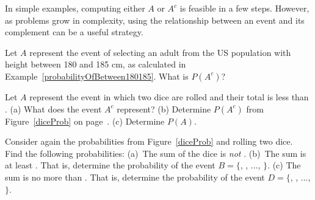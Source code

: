 In simple examples, computing either $A$ or $A^c$ is feasible in a few steps. However, as problems grow in complexity, using the relationship between an event and its complement can be a useful strategy.

\begin{exercisewrap}
\begin{nexercise}
Let $A$ represent the event of selecting an adult from the US population with height between 180 and 185 cm, as calculated in Example~\ref{probabilityOfBetween180185}. What is $P(A^c)$?\footnotemark{}
\end{nexercise}
\end{exercisewrap}

\begin{exercisewrap}
\begin{nexercise}
Let $A$ represent the event in which two dice are rolled and their total is less than . (a) What does the event $A^c$ represent? (b) Determine $P(A^c)$ from Figure~\ref{diceProb} on page~\pageref{diceProb}. (c) Determine $P(A)$.\footnotemark{}
\end{nexercise}
\end{exercisewrap}

\begin{exercisewrap}
\begin{nexercise}
Consider again the probabilities from Figure~\ref{diceProb} and rolling two dice. Find the following probabilities: (a)~The sum of the dice is \emph{not} . (b)~The sum is at least . That is, determine the probability of the event $B=\{$, , ..., $\}$. (c) The sum is no more than . That is, determine the probability of the event $D=\{$, , ..., $\}$.\footnotemark{}
\end{nexercise}
\end{exercisewrap}


